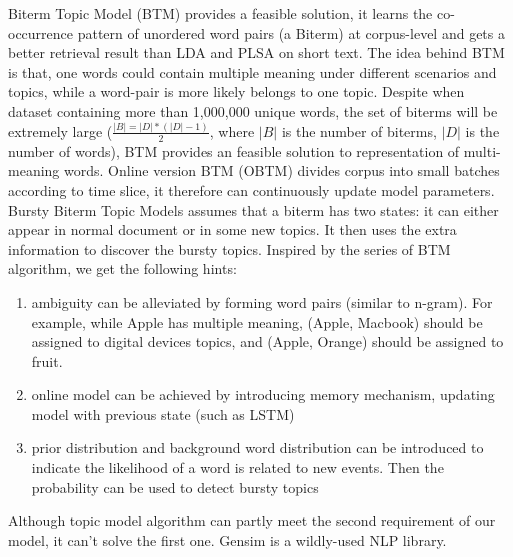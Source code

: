Biterm Topic Model (BTM) \cite{yan2013biterm, cheng2014btm} provides a feasible solution, it learns the co-occurrence pattern of unordered word pairs (a Biterm) at corpus-level and gets a better retrieval result than LDA and PLSA on short text. The idea behind BTM is that, one words could contain multiple meaning under different scenarios and topics, while a word-pair is more likely belongs to one topic. Despite when dataset containing more than 1,000,000 unique words, the set of biterms will be extremely large ($\frac{|B| = |D| * (|D|-1)}{2}$, where $|B|$ is the number of biterms, $|D|$ is the number of words), BTM provides an feasible solution to representation of multi-meaning words. Online version BTM (OBTM) \cite{cheng2014btm} divides corpus into small batches according to time slice, it therefore can continuously update model parameters. Bursty Biterm Topic Models \cite{yan2015probabilistic} assumes that a biterm has two states: it can either appear in normal document or in some new topics. It then uses the extra information to discover the bursty topics. Inspired by the series of BTM algorithm, we get the following hints:
\begin{enumerate}
    \item ambiguity can be alleviated by forming word pairs (similar to n-gram). For example, while Apple has multiple meaning, (Apple, Macbook) should be assigned to digital devices topics, and (Apple, Orange) should be assigned to fruit.
    \item online model can be achieved by introducing memory mechanism, updating model with previous state (such as LSTM)
    \item prior distribution and background word distribution can be introduced to indicate the likelihood of a word is related to new events. Then the probability can be used to detect bursty topics
\end{enumerate} 
Although topic model algorithm can partly meet the second requirement of our model, it can't solve the first one.
Gensim \cite{rehurek_lrec} is a wildly-used NLP library.